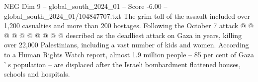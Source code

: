 \begin{textsample}{NEG Dim 9 – global\_south\_2024\_01 – Score -6.00 – global\_south\_2024\_01/104847707.txt}
The grim toll of the assault included over 1,200 casualties and more than 200 hostages.
Following the October 7 attack @ @ @ @ @ @ @ @ @ @ described as the deadliest attack on Gaza in years, killing over 22,000 Palestinians, including a vast number of kids and women.
According to a Human Rights Watch report, almost 1.9 million people -- 85 per cent of Gaza ' s population -- are displaced after the Israeli bombardment flattened houses, schools and hospitals.

\end{textsample}
